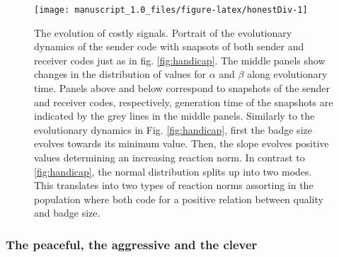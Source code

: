 \documentclass[
  12pt,
]{article}
\begin{document}
\begin{figure}

{\centering \texttt{[image: manuscript\_1.0\_files/figure-latex/honestDiv-1]} 

}

\caption{The evolution of costly signals. Portrait of the evolutionary dynamics of the sender code with snapsots of both sender and receiver codes just as in fig. \ref{fig:handicap}. The middle panels show changes in the distribution of values for $\alpha$ and $\beta$ along evolutionary time. Panels above and below correspond to snapshots of the sender and receiver codes, respectively, generation time of the snapshots are indicated by the grey lines in the middle panels. Similarly to the evolutionary dynamics in Fig. \ref{fig:handicap}, first the badge size evolves towards its minimum value. Then, the slope evolves positive values determining an increasing reaction norm. In contrast to \ref{fig:handicap}, the normal distribution splits up into two modes. This translates into two types of reaction norms assorting in the population where both code for a positive relation between quality and badge size.}\label{fig:honestDiv}
\end{figure}

\hypertarget{the-peaceful-the-aggressive-and-the-clever}{%
\subsubsection{The peaceful, the aggressive and the
clever}\label{the-peaceful-the-aggressive-and-the-clever}}
\end{document}
